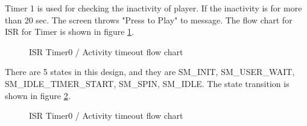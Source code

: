 \documentclass[a4paper,13pt,openany,sffamily]{memoir}
\begin{document}
\clearpage
Timer 1 is used for checking the inactivity of player. If the inactivity is for more than 20 sec. The screen throws "Press to Play" to message. The flow chart for ISR for Timer is shown in figure \ref{Fig_ISR_Timer0}. 
\begin{figure}[h]
\caption{ISR Timer0 / Activity timeout flow chart }
\label{Fig_ISR_Timer0}
\end{figure}

\clearpage
\newpage
There are 5 states in this design, and they are SM\_INIT, SM\_USER\_WAIT, SM\_IDLE\_TIMER\_START, SM\_SPIN, SM\_IDLE. The state transition is shown in figure \ref{Fig_State_Diagram}. 

\begin{figure}[h]
\caption{ISR Timer0 / Activity timeout flow chart }
\label{Fig_State_Diagram}
\end{figure}
\end{document}
